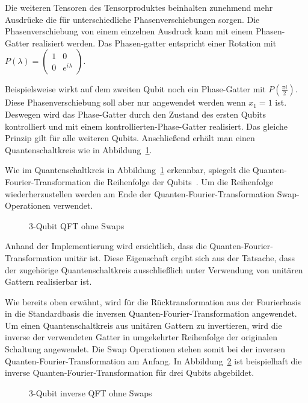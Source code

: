 Die weiteren Tensoren des Tensorproduktes beinhalten zunehmend mehr Ausdrücke die für unterschiedliche Phasenverschiebungen sorgen.
Die Phasenverschiebung von einem einzelnen Ausdruck kann mit einem Phasen-Gatter realisiert werden.
Das Phasen-gatter entspricht einer Rotation mit \(P(\lambda) = 
\begin{pmatrix}
  1 & 0 \\
  0 & e^{i \lambda}
\end{pmatrix}\).

Beispielsweise wirkt auf dem zweiten Qubit noch ein Phase-Gatter mit \(P(\frac{\pi i}{2} )\).
Diese Phasenverschiebung soll aber nur angewendet werden wenn \(x_1 = 1\) ist.
Deswegen wird das Phase-Gatter durch den Zustand des ersten Qubits kontrolliert und
mit einem kontrollierten-Phase-Gatter realisiert.
Das gleiche Prinzip gilt für alle weiteren Qubits.
Anschließend erhält man einen Quantenschaltkreis wie in Abbildung~\ref{fig:qft}.

Wie im Quantenschaltkreis in Abbildung~\ref{fig:qft} erkennbar, 
spiegelt die Quanten-Fourier-Transformation die Reihenfolge der Qubits~\cite{Hoever2023QC}.
Um die Reihenfolge wiederherzustellen werden am Ende der Quanten-Fourier-Transformation Swap-Operationen verwendet.
\begin{figure}
\caption{3-Qubit QFT ohne Swaps}
\label{fig:qft}
\centering
\end{figure}

Anhand der Implementierung wird ersichtlich,
dass die Quanten-Fourier-Transformation unitär ist. 
Diese Eigenschaft ergibt sich aus der Tatsache, 
dass der zugehörige Quantenschaltkreis ausschließlich unter Verwendung von unitären Gattern realisierbar ist.

Wie bereits oben erwähnt, 
wird für die Rücktransformation aus der Fourierbasis in die Standardbasis 
die inversen Quanten-Fourier-Transformation angewendet.
Um einen Quantenschaltkreis aus unitären Gattern zu invertieren, 
wird die inverse der verwendeten Gatter
in umgekehrter Reihenfolge der originalen Schaltung angewendet.
Die Swap Operationen stehen somit bei der inversen Quanten-Fourier-Transformation am Anfang.
In Abbildung~\ref{fig:iqft} ist beispielhaft die inverse Quanten-Fourier-Transformation für drei Qubits abgebildet.
\begin{figure}
\caption{3-Qubit inverse QFT ohne Swaps}
\label{fig:iqft}
\centering
\end{figure}

